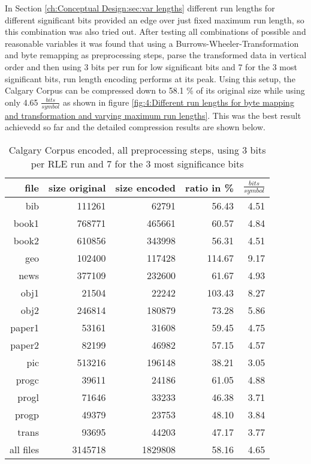 \par{
In Section \ref{ch:Conceptual Design:sec:var lengths} different run lengths for different significant bits provided an edge over just fixed maximum run length, so this combination was also tried out. After testing all combinations of possible and reasonable variables it was found that using a Burrows-Wheeler-Transformation and byte remapping as preprocessing steps, parse the transformed data in vertical order and then using 3 bits per run for low significant bits and 7 for the 3 most significant bits, run length encoding performs at its peak. Using this setup, the Calgary Corpus can be compressed down to 58.1 \% of its original size while using only 4.65 $\frac{bits}{symbol}$ as shown in figure \ref{fig:4:Different run lengths for byte mapping and transformation and varying maximum run lengths}. This was the best result achievedd so far and the detailed compression results are shown below.
\begin{table}[H]
	\centering
	\begin{tabular}{r|r|r|r|r}	
		file & size original & size encoded & ratio in \% & $\frac{bits}{symbol}$\\
		\hline
		bib & 111261 & 62791 & 56.43 & 4.51\\
		book1 & 768771 & 465661 & 60.57 & 4.84 \\
		book2 & 610856 & 343998 & 56.31 & 4.51\\
		geo & 102400 & 117428 & 114.67 & 9.17\\
		news & 377109 & 232600 & 61.67 & 4.93\\
		obj1 & 21504 & 22242 & 103.43 & 8.27\\
		obj2& 246814 & 180879 & 73.28 & 5.86\\		 
		paper1 & 53161 & 31608 & 59.45 & 4.75\\		 
		paper2& 82199 & 46982 & 57.15 & 4.57\\		 
		pic & 513216 & 196148 & 38.21 & 3.05\\		 
		progc & 39611 & 24186 & 61.05 & 4.88\\		 
		progl & 71646 & 33233 & 46.38 & 3.71\\		 
		progp & 49379 & 23753 & 48.10 & 3.84\\		 
		trans & 93695 & 44203 & 47.17 & 3.77\\
		\hline
		all files & 3145718 & 1829808 & 58.16 & 4.65
	\end{tabular}
	\caption{Calgary Corpus encoded, all preprocessing steps, using 3 bits per RLE run and 7 for the 3 most significance bits}

\end{table}}
